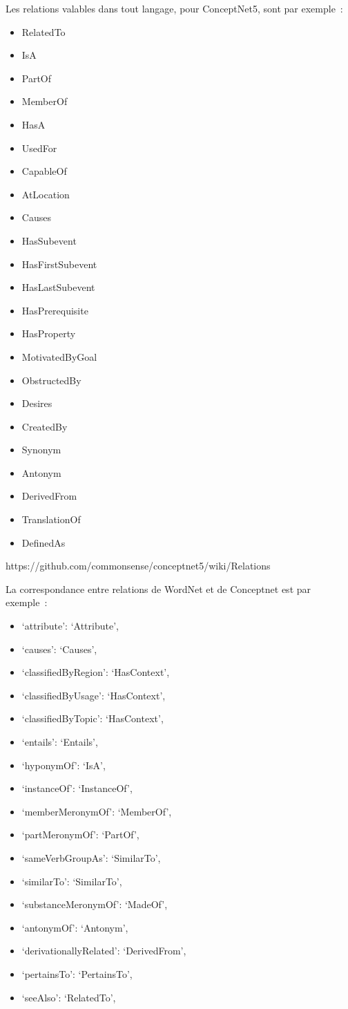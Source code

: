 \documentclass{article}           %
\begin{document}
Les relations valables dans tout langage, pour ConceptNet5, sont par exemple~: 
\begin{itemize}
 \item RelatedTo
 \item IsA
 \item PartOf
 \item MemberOf
 \item HasA
 \item UsedFor
 \item CapableOf
 \item AtLocation
 \item Causes
 \item HasSubevent
 \item HasFirstSubevent
 \item HasLastSubevent
 \item HasPrerequisite
 \item HasProperty
 \item MotivatedByGoal
 \item ObstructedBy
 \item Desires
 \item CreatedBy
 \item Synonym
 \item Antonym
 \item DerivedFrom
 \item TranslationOf
 \item DefinedAs
\end{itemize}

https://github.com/commonsense/conceptnet5/wiki/Relations

La correspondance entre relations de WordNet et de Conceptnet est par exemple~:
\begin{itemize}
 \item `attribute': `Attribute',
 \item `causes': `Causes',
 \item `classifiedByRegion': `HasContext',
 \item `classifiedByUsage': `HasContext',
 \item `classifiedByTopic': `HasContext',
 \item `entails': `Entails',
 \item `hyponymOf': `IsA',
 \item `instanceOf': `InstanceOf',
  \item  `memberMeronymOf': `MemberOf',
  \item  `partMeronymOf': `PartOf',
  \item  `sameVerbGroupAs': `SimilarTo',
  \item  `similarTo': `SimilarTo',
  \item  `substanceMeronymOf': `MadeOf',
  \item  `antonymOf': `Antonym',
  \item  `derivationallyRelated': `DerivedFrom',
  \item  `pertainsTo': `PertainsTo',
  \item  `seeAlso': `RelatedTo',
\end{itemize}
\end{document}
